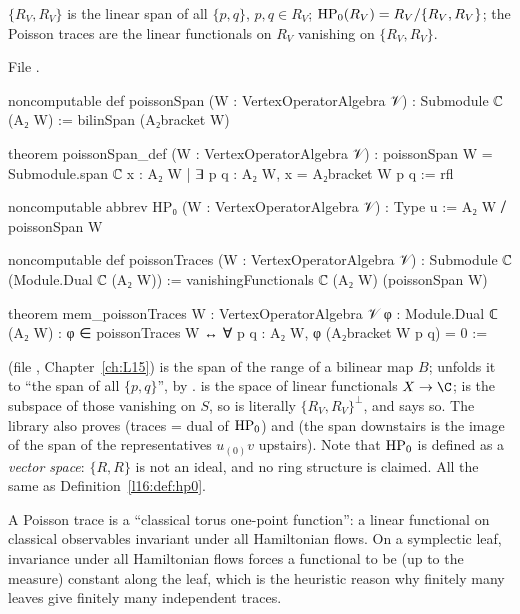 \begin{definition}\label{l16:def:poissonSpan}
$\{R_V,R_V\}$ is the linear span of all $\{p,q\}$, $p,q\in R_V$; $\mathrm{HP}_0(R_V) = R_V/\{R_V,R_V\}$; the Poisson
traces are the linear functionals on $R_V$ vanishing on $\{R_V,R_V\}$.
\end{definition}
\noindent File .
\begin{leancode}
noncomputable def poissonSpan (W : VertexOperatorAlgebra 𝒱) : Submodule ℂ (A₂ W) :=
  bilinSpan (A₂bracket W)

theorem poissonSpan_def (W : VertexOperatorAlgebra 𝒱) :
    poissonSpan W = Submodule.span ℂ {x : A₂ W | ∃ p q : A₂ W, x = A₂bracket W p q} := rfl

noncomputable abbrev HP₀ (W : VertexOperatorAlgebra 𝒱) : Type u := A₂ W ⧸ poissonSpan W

noncomputable def poissonTraces (W : VertexOperatorAlgebra 𝒱) :
    Submodule ℂ (Module.Dual ℂ (A₂ W)) :=
  vanishingFunctionals ℂ (A₂ W) (poissonSpan W)

theorem mem_poissonTraces {W : VertexOperatorAlgebra 𝒱} {φ : Module.Dual ℂ (A₂ W)} :
    φ ∈ poissonTraces W ↔ ∀ p q : A₂ W, φ (A₂bracket W p q) = 0 :=
\end{leancode}

\begin{dictionary}
 (file , Chapter~\ref{ch:L15}) is the
span of the range of a bilinear map $B$;  unfolds it to ``the span of all
$\{p,q\}$'', by .  is the space of linear functionals $X\to\C$;
 is the subspace of those vanishing on $S$, so  is literally
$\{R_V,R_V\}^{\perp}$, and  says so. The library also proves
\allowbreak{} (traces = dual of $\mathrm{HP}_0$) and
 (the span downstairs is the image of the span of the representatives
$u_{(0)}v$ upstairs). Note that $\mathrm{HP}_0$ is defined as a \emph{vector space}: $\{R,R\}$ is not an ideal, and no
ring structure is claimed. All the same as Definition~\ref{l16:def:hp0}.
\end{dictionary}

\begin{physics}
A Poisson trace is a ``classical torus one-point function'': a linear functional on classical observables
invariant under all Hamiltonian flows. On a symplectic leaf, invariance under all Hamiltonian flows forces a
functional to be (up to the measure) constant along the leaf, which is the heuristic reason why finitely many
leaves give finitely many independent traces.
\end{physics}

